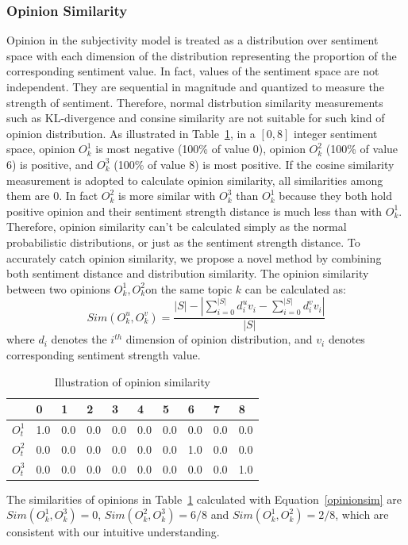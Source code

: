 \documentclass[letterpaper]{article}
\begin{document}
\subsubsection{Opinion Similarity}
\label{opsim}

Opinion in the subjectivity model is treated  as a distribution over sentiment space with each dimension of the distribution representing the proportion of the corresponding sentiment value. 
In fact, values of the sentiment space are not independent. 
They are sequential in magnitude and quantized to measure the strength of sentiment. Therefore, normal distrbution similarity measurements such as KL-divergence and consine similarity are not suitable for such kind of opinion distribution. As illustrated in Table~\ref{tab1}, in a $ [0,8 ] $ integer sentiment space, opinion $ O_{k}^{1} $ is most negative (100\% of value 0), opinion $ O_{k}^{2} $ (100\% of value 6) is positive, and $ O_{k}^{3} $ (100\% of value 8) is most positive.
If the cosine similarity measurement is adopted to calculate opinion similarity, all similarities among them are 0.
In fact $ O_{k}^{2} $ is more similar with $ O_{k}^{3} $ than $O_{k}^{1} $ because they both hold positive opinion and their sentiment strength distance is much less than with $ O_{k}^{1} $.  
Therefore, opinion similarity can't be calculated simply as the normal probabilistic distributions, or just as the sentiment strength distance. 
To accurately catch opinion similarity, we propose a novel method by combining both sentiment distance and distribution similarity.
The opinion similarity between two opinions $O_{k}^{1},O_{k}^{2} $on the same topic $ k $ can be calculated as: 
\begin{equation}
\label{opinionsim}
Sim(O_{k}^{u},O_{k}^{v})=\dfrac{|S|-|\sum_{i=0}^{|S|}d_{i}^{u}v_{i}-\sum_{i=0}^{|S|}d_{i}^{v}v_{i}|}{|S|}
\end{equation}
where $ d_{i} $ denotes the $ i^{th} $ dimension of opinion distribution, and $ v_{i} $ denotes corresponding sentiment strength value. 
\begin{table}[htb]
\scriptsize
\centering
\caption{Illustration of opinion similarity}
\label{tab1}
\begin{tabular}{|l|l|l|l|l|l|l|l|l|l|}
\hline
 & 0 & 1& 2 & 3 & 4 & 5 & 6 & 7 & 8 \\
\hline
$O_{t}^{1}$ & 1.0 & 0.0 & 0.0 & 0.0 & 0.0 & 0.0 & 0.0 & 0.0 & 0.0 \\
\hline
$O_{t}^{2}$ & 0.0 & 0.0 & 0.0 & 0.0 & 0.0 & 0.0 & 1.0 & 0.0 & 0.0 \\
\hline
$O_{t}^{3}$ & 0.0 & 0.0 & 0.0 & 0.0 & 0.0 & 0.0 & 0.0 & 0.0 & 1.0 \\
\hline
\end{tabular}
\end{table} 
The similarities of opinions in Table~\ref{tab1} calculated with Equation~\ref{opinionsim} are $ Sim(O_{k}^{1},O_{k}^{3})=0 $, $ Sim(O_{k}^{2},O_{k}^{3})=6/8 $ and $ Sim(O_{k}^{1},O_{k}^{2})=2/8 $, which are consistent with our intuitive understanding. 
\end{document}
